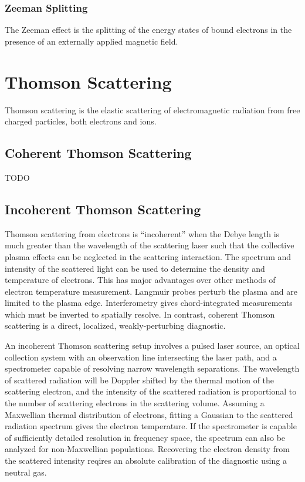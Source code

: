 \documentclass{jpp}
\begin{document}
\subsubsection{Zeeman Splitting}

The Zeeman effect is the splitting of the energy states of bound electrons in the presence of an externally applied magnetic field. 

\section{Thomson Scattering}

Thomson scattering is the elastic scattering of electromagnetic radiation from free charged particles, both electrons and ions. 

\subsection{Coherent Thomson Scattering}

{\Large TODO \par}

\subsection{Incoherent Thomson Scattering}

Thomson scattering from electrons is ``incoherent'' when the Debye length is much greater than the wavelength of the scattering laser such that the collective plasma effects can be neglected in the scattering interaction. The spectrum and intensity of the scattered light can be used to determine the density and temperature of electrons. This has major advantages over other methods of electron temperature measurement. Langmuir probes perturb the plasma and are limited to the plasma edge. Interferometry gives chord-integrated measurements which must be inverted to spatially resolve. In contrast, coherent Thomson scattering is a direct, localized, weakly-perturbing diagnostic.

An incoherent Thomson scattering setup involves a pulsed laser source, an optical collection system with an observation line intersecting the laser path, and a spectrometer capable of resolving narrow wavelength separations. The wavelength of scattered radiation will be Doppler shifted by the thermal motion of the scattering electron, and the intensity of the scattered radiation is proportional to the number of scattering electrons in the scattering volume. Assuming a Maxwellian thermal distribution of electrons, fitting a Gaussian to the scattered radiation spectrum gives the electron temperature. If the spectrometer is capable of sufficiently detailed resolution in frequency space, the spectrum can also be analyzed for non-Maxwellian populations. Recovering the electron density from the scattered intensity reqires an absolute calibration of the diagnostic using a neutral gas.
\end{document}
